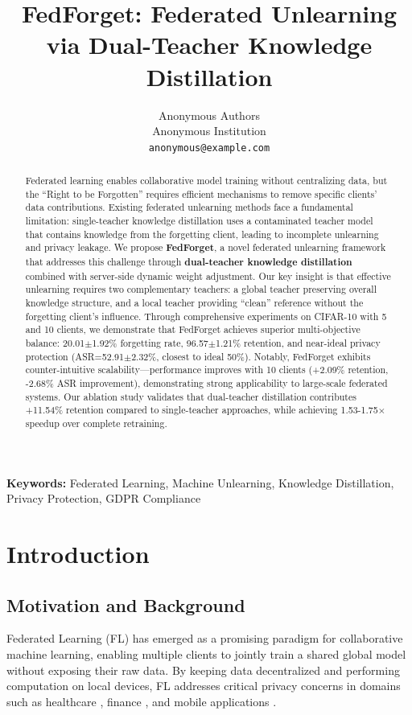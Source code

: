 \documentclass[10pt,twocolumn]{article}
\title{FedForget: Federated Unlearning via Dual-Teacher Knowledge Distillation}
\author{
Anonymous Authors\\
Anonymous Institution\\
\texttt{anonymous@example.com}
}
\date{}
\begin{document}
\maketitle

\begin{abstract}
Federated learning enables collaborative model training without centralizing data, but the ``Right to be Forgotten'' requires efficient mechanisms to remove specific clients' data contributions. Existing federated unlearning methods face a fundamental limitation: single-teacher knowledge distillation uses a contaminated teacher model that contains knowledge from the forgetting client, leading to incomplete unlearning and privacy leakage. We propose \textbf{FedForget}, a novel federated unlearning framework that addresses this challenge through \textbf{dual-teacher knowledge distillation} combined with server-side dynamic weight adjustment. Our key insight is that effective unlearning requires two complementary teachers: a global teacher preserving overall knowledge structure, and a local teacher providing ``clean'' reference without the forgetting client's influence. Through comprehensive experiments on CIFAR-10 with 5 and 10 clients, we demonstrate that FedForget achieves superior multi-objective balance: 20.01$\pm$1.92\% forgetting rate, 96.57$\pm$1.21\% retention, and near-ideal privacy protection (ASR=52.91$\pm$2.32\%, closest to ideal 50\%). Notably, FedForget exhibits counter-intuitive scalability---performance improves with 10 clients (+2.09\% retention, -2.68\% ASR improvement), demonstrating strong applicability to large-scale federated systems. Our ablation study validates that dual-teacher distillation contributes +11.54\% retention compared to single-teacher approaches, while achieving 1.53-1.75$\times$ speedup over complete retraining.
\end{abstract}

\textbf{Keywords:} Federated Learning, Machine Unlearning, Knowledge Distillation, Privacy Protection, GDPR Compliance

\section{Introduction}

\subsection{Motivation and Background}

Federated Learning (FL) \cite{mcmahan2017communication} has emerged as a promising paradigm for collaborative machine learning, enabling multiple clients to jointly train a shared global model without exposing their raw data. By keeping data decentralized and performing computation on local devices, FL addresses critical privacy concerns in domains such as healthcare \cite{rieke2020future}, finance \cite{yang2019federated}, and mobile applications \cite{hard2018federated,kairouz2021advances,li2020federated}.
\end{document}
